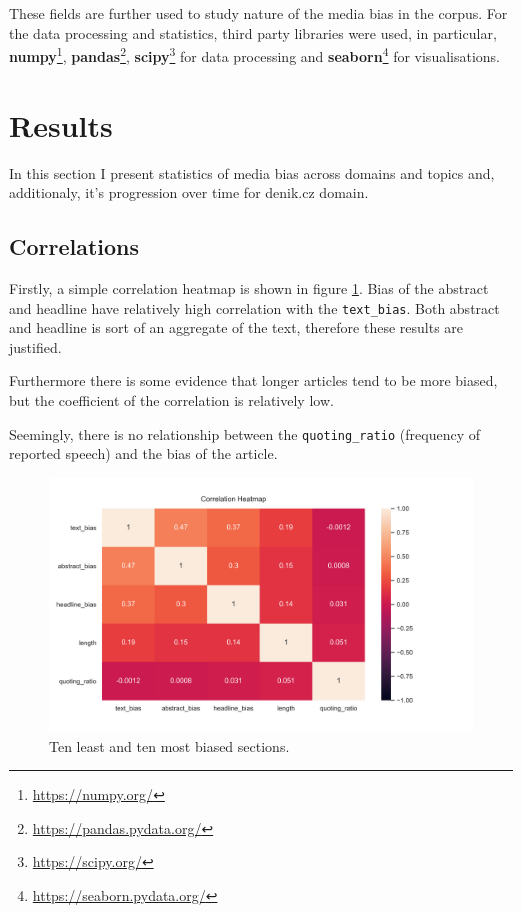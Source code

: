 These fields are further used to study nature of the media bias in the corpus.
For the data processing and statistics, third party libraries were used, in particular, \textbf{numpy}\footnote{\url{https://numpy.org/}}, \textbf{pandas}\footnote{\url{https://pandas.pydata.org/}}, \textbf{scipy}\footnote{\url{https://scipy.org/}} for data processing and \textbf{seaborn}\footnote{\url{https://seaborn.pydata.org/}} for visualisations.


\section{Results}
In this section I present statistics of media bias across domains and topics and, additionaly, it's progression over time for denik.cz domain.

\subsection{Correlations}
Firstly, a simple correlation heatmap is shown in figure \ref{fig:corr}. Bias of the abstract and headline have relatively high correlation with the \verb|text_bias|. Both abstract and headline is sort of an aggregate of the text, therefore these results are justified.

Furthermore there is some evidence that longer articles tend to be more biased, but the coefficient of the correlation is relatively low.

Seemingly, there is no relationship between the \verb|quoting_ratio| (frequency of reported speech)
and the bias of the article.

\begin{figure}

  \includegraphics[scale=0.5]{my_modules/multimedia/inference/corr.png}
  \caption{Ten least and ten most biased sections.}
  \label{fig:corr}

\end{figure}


